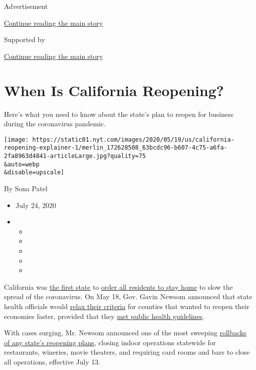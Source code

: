 Advertisement

\protect\hyperlink{after-top}{Continue reading the main story}

Supported by

\protect\hyperlink{after-sponsor}{Continue reading the main story}

\hypertarget{when-is-california-reopening}{%
\section{When Is California
Reopening?}\label{when-is-california-reopening}}

Here's what you need to know about the state's plan to reopen for
business during the coronavirus pandemic.

\texttt{[image: https://static01.nyt.com/images/2020/05/19/us/california-reopening-explainer-1/merlin\_172628508\_63bcdc96-b607-4c75-a6fa-2fa8963d4841-articleLarge.jpg?quality=75\\\&auto=webp\\\&disable=upscale]}

By Sona Patel

\begin{itemize}
\item
  July 24, 2020
\item
  \begin{itemize}
  \item
  \item
  \item
  \item
  \item
  \end{itemize}
\end{itemize}

California was
\href{https://www.nytimes.com/interactive/2020/us/states-reopen-map-coronavirus.html?action=click\&pgtype=Article\&state=default\&module=styln-coronavirus\&variant=show\&region=TOP_BANNER\&context=storylines_menu}{the
first state} to
\href{https://www.nytimes.com/2020/03/16/us/california-newsom-bars-home-isolation.html}{order
all residents to stay home} to slow the spread of the coronavirus. On
May 18, Gov. Gavin Newsom announced that state health officials would
\href{https://www.sfchronicle.com/politics/article/Gov-Gavin-Newsom-eases-reopening-requirements-15278477.php}{relax
their criteria} for counties that wanted to reopen their economies
faster, provided that they
\href{https://www.nytimes.com/2020/05/19/us/california-reopening.html}{met
public health guidelines}.

With cases surging, Mr. Newsom announced one of the most sweeping
\href{https://twitter.com/GavinNewsom/status/1282752861835649024?s=20}{rollbacks
of any state's reopening plans}, closing indoor operations statewide for
restaurants, wineries, movie theaters, and requiring card rooms and bars
to close all operations, effective July 13.

